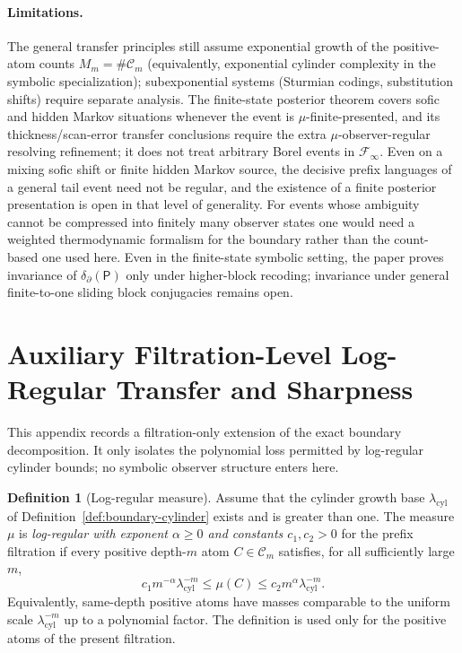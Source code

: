 \documentclass{etds}%
\numberwithin{equation}{section}
\theoremstyle{plain}
\theoremstyle{definition}
\newtheorem{definition}[theorem]{Definition}
\theoremstyle{remark}
\begin{document}
\paragraph{Limitations.}
The general transfer principles still assume exponential growth of the positive-atom
counts $M_m=\#\mathcal{C}_m$ (equivalently, exponential cylinder complexity in
the symbolic specialization);
subexponential systems (Sturmian codings, substitution shifts) require
separate analysis.  The finite-state posterior theorem covers sofic and hidden
Markov situations whenever the event is $\mu$-finite-presented, and its
thickness/scan-error transfer conclusions require the extra
$\mu$-observer-regular resolving refinement; it does not treat arbitrary Borel
events in $\mathcal{F}_\infty$.  Even on a
mixing sofic shift or finite hidden Markov source, the decisive prefix
languages of a general tail event need not be regular, and the existence of a
finite posterior presentation is open in that level of generality.  For events
whose ambiguity cannot be compressed into finitely many observer states one
would need a weighted thermodynamic formalism for the boundary rather than the
count-based one used here.  Even in the finite-state symbolic setting, the
paper proves invariance of $\delta_\partial(\mathsf{P})$ only under
higher-block recoding; invariance under general finite-to-one sliding block
conjugacies remains open.

\appendix

\section{Auxiliary Filtration-Level Log-Regular Transfer and Sharpness}
\label{sub:nonuniform}

This appendix records a filtration-only extension of the exact boundary
decomposition.  It only isolates the polynomial loss permitted by log-regular
cylinder bounds; no symbolic observer structure enters here.

\begin{definition}[Log-regular measure]
\label{def:log-regular}
Assume that the cylinder growth base $\lambda_{\mathrm{cyl}}$ of
Definition~\ref{def:boundary-cylinder} exists and is greater than one.  The
measure $\mu$ is \emph{log-regular with exponent $\alpha\ge 0$ and constants
$c_1,c_2>0$} for the prefix filtration if every positive depth-$m$ atom
$C\in\mathcal{C}_m$ satisfies, for all sufficiently large $m$,
\[
c_1 m^{-\alpha}\lambda_{\mathrm{cyl}}^{-m}
\le \mu(C)\le
c_2 m^{\alpha}\lambda_{\mathrm{cyl}}^{-m}.
\]
Equivalently, same-depth positive atoms have masses comparable to the uniform
scale $\lambda_{\mathrm{cyl}}^{-m}$ up to a polynomial factor.  The definition
is used only for the positive atoms of the present filtration.
\end{definition}
\end{document}
